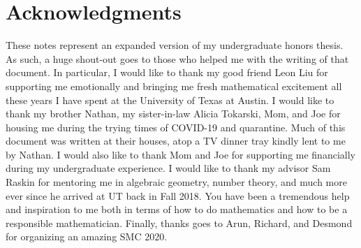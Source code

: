 \documentclass[11pt]{article}
\begin{document}
\newpage
\section{Acknowledgments}
These notes represent an expanded version of my undergraduate honors thesis. As such, a huge shout-out goes to those who helped me with the writing of that document. In particular, I would like to thank my good friend Leon Liu for supporting me emotionally and bringing me fresh mathematical excitement all these years I have spent at the University of Texas at Austin. I would like to thank my brother Nathan, my sister-in-law Alicia Tokarski, Mom, and Joe for housing me during the trying times of COVID-19 and quarantine. Much of this document was written at their houses, atop a TV dinner tray kindly lent to me by Nathan. I would also like to thank Mom and Joe for supporting me financially during my undergraduate experience. I would like to thank my advisor Sam Raskin for mentoring me in algebraic geometry, number theory, and much more ever since he arrived at UT back in Fall 2018. You have been a tremendous help and inspiration to me both in terms of how to do mathematics and how to be a responsible mathematician. Finally, thanks goes to Arun, Richard, and Desmond for organizing an amazing SMC 2020.

\newpage
\printbibliography[heading=bibintoc,title={References}]
\end{document}
